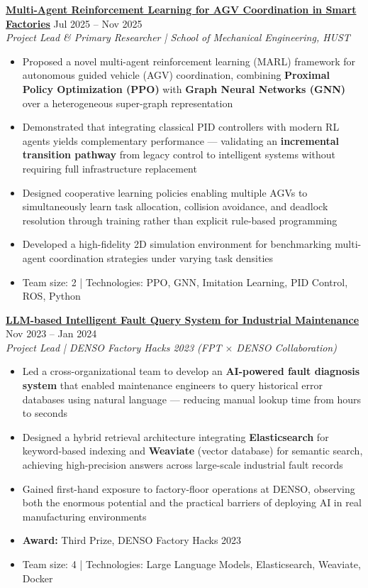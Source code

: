 \documentclass[11pt,letterpaper]{article}
\newcommand{\entry}[4]{
  \textbf{#1} \hfill #2 \\
  \textit{#3} \\
  #4
  \vspace{0.3em}
}
\begin{document}
\entry
  {\href{https://andrewhaward2310.github.io/gnn-il-ppo-paper/}{Multi-Agent Reinforcement Learning for AGV Coordination in Smart Factories}}
  {Jul 2025 -- Nov 2025}
  {Project Lead \& Primary Researcher | School of Mechanical Engineering, HUST}
  {
    \begin{itemize}[leftmargin=1.5em, topsep=0pt, itemsep=0.2em]
      \item Proposed a novel multi-agent reinforcement learning (MARL) framework for autonomous guided vehicle (AGV) coordination, combining \textbf{Proximal Policy Optimization (PPO)} with \textbf{Graph Neural Networks (GNN)} over a heterogeneous super-graph representation
      \item Demonstrated that integrating classical PID controllers with modern RL agents yields complementary performance --- validating an \textbf{incremental transition pathway} from legacy control to intelligent systems without requiring full infrastructure replacement
      \item Designed cooperative learning policies enabling multiple AGVs to simultaneously learn task allocation, collision avoidance, and deadlock resolution through training rather than explicit rule-based programming
      \item Developed a high-fidelity 2D simulation environment for benchmarking multi-agent coordination strategies under varying task densities
      \item Team size: 2 | Technologies: PPO, GNN, Imitation Learning, PID Control, ROS, Python
    \end{itemize}
  }

\entry
  {\href{https://vjst.vn/cuoc-thi-hackathon-cua-denso-va-fpt-software-co-giai-thuong-200-trieu-dong-59481.html}{LLM-based Intelligent Fault Query System for Industrial Maintenance}}
  {Nov 2023 -- Jan 2024}
  {Project Lead | DENSO Factory Hacks 2023 (FPT $\times$ DENSO Collaboration)}
  {
    \begin{itemize}[leftmargin=1.5em, topsep=0pt, itemsep=0.2em]
      \item Led a cross-organizational team to develop an \textbf{AI-powered fault diagnosis system} that enabled maintenance engineers to query historical error databases using natural language --- reducing manual lookup time from hours to seconds
      \item Designed a hybrid retrieval architecture integrating \textbf{Elasticsearch} for keyword-based indexing and \textbf{Weaviate} (vector database) for semantic search, achieving high-precision answers across large-scale industrial fault records
      \item Gained first-hand exposure to factory-floor operations at DENSO, observing both the enormous potential and the practical barriers of deploying AI in real manufacturing environments
      \item \textbf{Award:} Third Prize, DENSO Factory Hacks 2023
      \item Team size: 4 | Technologies: Large Language Models, Elasticsearch, Weaviate, Docker
    \end{itemize}
  }
\end{document}
